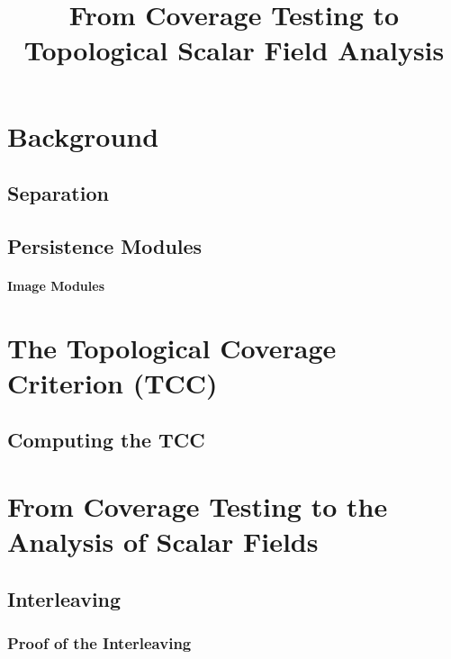 \documentclass[12pt]{article}
\begin{document}
\title{From Coverage Testing to Topological Scalar Field Analysis}




\section{Background}
\subsection{Separation}
  

\subsection{Persistence Modules}
  

  \paragraph{Image Modules}
    


\clearpage
\section{The Topological Coverage Criterion (TCC)}


\subsection{Computing the TCC}
  


\clearpage
\section{From Coverage Testing to the Analysis of Scalar Fields}


\subsection{Interleaving}
  

  \subsubsection{Proof of the Interleaving}
    
\end{document}
